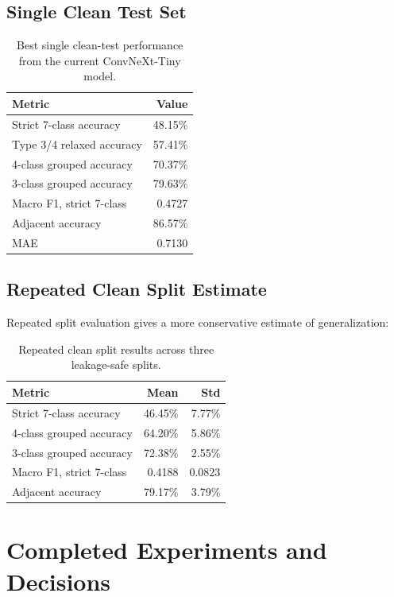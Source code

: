 \documentclass[11pt]{article}
\begin{document}
\subsection{Single Clean Test Set}

\begin{table}[h]
\centering
\begin{tabular}{lr}
\toprule
Metric & Value \\
\midrule
Strict 7-class accuracy & 48.15\% \\
Type 3/4 relaxed accuracy & 57.41\% \\
4-class grouped accuracy & 70.37\% \\
3-class grouped accuracy & 79.63\% \\
Macro F1, strict 7-class & 0.4727 \\
Adjacent accuracy & 86.57\% \\
MAE & 0.7130 \\
\bottomrule
\end{tabular}
\caption{Best single clean-test performance from the current ConvNeXt-Tiny model.}
\end{table}

\subsection{Repeated Clean Split Estimate}

Repeated split evaluation gives a more conservative estimate of generalization:

\begin{table}[h]
\centering
\begin{tabular}{lrr}
\toprule
Metric & Mean & Std \\
\midrule
Strict 7-class accuracy & 46.45\% & 7.77\% \\
4-class grouped accuracy & 64.20\% & 5.86\% \\
3-class grouped accuracy & 72.38\% & 2.55\% \\
Macro F1, strict 7-class & 0.4188 & 0.0823 \\
Adjacent accuracy & 79.17\% & 3.79\% \\
\bottomrule
\end{tabular}
\caption{Repeated clean split results across three leakage-safe splits.}
\end{table}

\section{Completed Experiments and Decisions}
\end{document}

